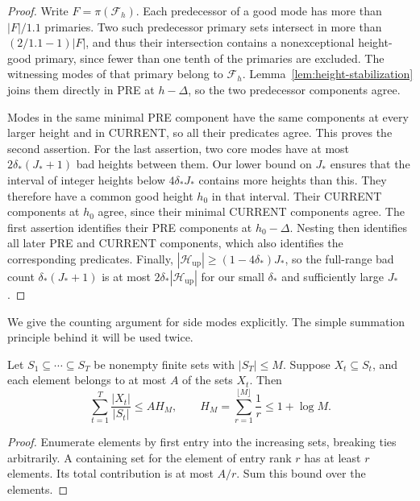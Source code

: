 \begin{proof}
Write \(F=\pi(\mathcal F_h)\).  Each predecessor of a good mode has
more than \(|F|/1.1\) primaries.  Two such predecessor primary sets
intersect in more than
\((2/1.1-1)|F|\), and thus their intersection contains a
nonexceptional height-good primary, since fewer than one tenth of
the primaries are excluded.  The witnessing modes of that primary
belong to \(\mathcal F_h\).  Lemma~\ref{lem:height-stabilization}
joins them directly in PRE at \(h-\Delta\), so the two predecessor
components agree.

Modes in the same minimal PRE component have the same components
at every larger height and in CURRENT, so all their predicates
agree.  This proves the second assertion.
For the last assertion, two core modes have at most
\(2\delta_*(J_*+1)\) bad heights between them.
Our lower bound on \(J_*\) ensures that the interval of integer
heights below \(4\delta_*J_*\) contains more heights than this.
They therefore have a common good height \(h_0\) in that interval.
Their CURRENT components at \(h_0\) agree, since their minimal
CURRENT components agree.  The first assertion identifies their
PRE components at \(h_0-\Delta\).
Nesting then identifies all later PRE and CURRENT components, which
also identifies the corresponding predicates.
Finally, \(|\mathcal H_{\mathrm{up}}|\ge(1-4\delta_*)J_*\), so
the full-range bad count \(\delta_*(J_*+1)\) is at most
\(2\delta_*|\mathcal H_{\mathrm{up}}|\) for our small
\(\delta_*\) and sufficiently large \(J_*\).
\end{proof}

We give the counting argument for side modes explicitly.
The simple summation principle behind it will be used twice.

\begin{lemma}
\label{lem:entry-rank}
Let \(S_1\subseteq\cdots\subseteq S_T\) be nonempty finite sets with
\(|S_T|\le M\).  Suppose \(X_t\subseteq S_t\), and each element
belongs to at most \(A\) of the sets \(X_t\).  Then
\[
 \sum_{t=1}^T\frac{|X_t|}{|S_t|}
   \le A H_M,\qquad
 H_M=\sum_{r=1}^{\lfloor M\rfloor}\frac1r\le1+\log M.
\]
\end{lemma}

\begin{proof}
Enumerate elements by first entry into the increasing sets, breaking
ties arbitrarily.  A containing set for the element of entry rank
\(r\) has at least \(r\) elements.  Its total contribution is at most
\(A/r\).  Sum this bound over the elements.
\end{proof}

